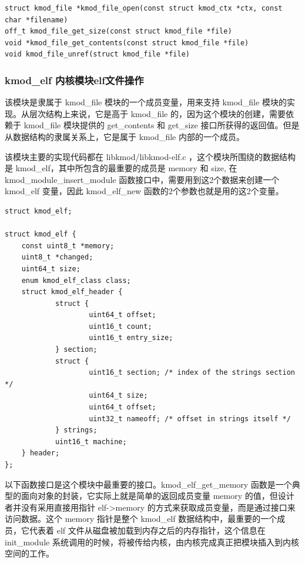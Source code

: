 \documentclass[11pt,a4paper]{article}
\begin{document}
{\begin{shaded}\begin{verbatim}
struct kmod_file *kmod_file_open(const struct kmod_ctx *ctx, const char *filename)  
off_t kmod_file_get_size(const struct kmod_file *file)
void *kmod_file_get_contents(const struct kmod_file *file)
void kmod_file_unref(struct kmod_file *file)
\end{verbatim}\end{shaded}}
\subsubsection{kmod\_elf 内核模块elf文件操作}

该模块是隶属于 kmod\_file 模块的一个成员变量，用来支持 kmod\_file
模块的实现。从层次结构上来说，它是高于 kmod\_file
的，因为这个模块的创建，需要依赖于 kmod\_file 模块提供的 get\_contents 和
get\_size 接口所获得的返回值。但是从数据结构的隶属关系上，它是属于
kmod\_file 内部的一个成员。

该模块主要的实现代码都在 libkmod/libkmod-elf.c
，这个模块所围绕的数据结构是 kmod\_elf，其中所包含的最重要的成员是 memory
和 size, 在 kmod\_module\_insert\_module
函数接口中，需要用到这2个数据来创建一个 kmod\_elf 变量，因此
kmod\_elf\_new 函数的2个参数也就是用的这2个变量。

{\begin{shaded}\begin{verbatim}
struct kmod_elf;

struct kmod_elf {
    const uint8_t *memory;
    uint8_t *changed;
    uint64_t size;
    enum kmod_elf_class class;
    struct kmod_elf_header {
            struct {
                    uint64_t offset;
                    uint16_t count;
                    uint16_t entry_size;
            } section;
            struct {
                    uint16_t section; /* index of the strings section */
                    uint64_t size;
                    uint64_t offset;
                    uint32_t nameoff; /* offset in strings itself */
            } strings;   
            uint16_t machine;
    } header;    
};
\end{verbatim}\end{shaded}}
以下函数接口是这个模块中最重要的接口。kmod\_elf\_get\_memory
函数是一个典型的面向对象的封装，它实际上就是简单的返回成员变量 memory
的值，但设计者并没有采用直接用指针 elf-\textgreater{}memory
的方式来获取成员变量，而是通过接口来访问数据。这个 memory 指针是整个
kmod\_elf 数据结构中，最重要的一个成员，它代表着 elf
文件从磁盘被加载到内存之后的内存指针，这个信息在 init\_module
系统调用的时候，将被传给内核，由内核完成真正把模块插入到内核空间的工作。
\end{document}
